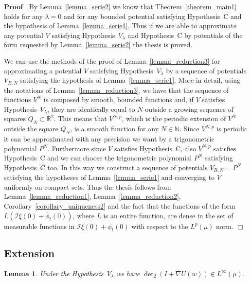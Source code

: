 \documentclass[a4paper,10pt]{article}
\newenvironment{proof}{\noindent\textbf{Proof\ }}{\hspace*{\fill}$\Box$\medskip}
\newtheorem{lemma}{Lemma}
\begin{document}
\begin{proof}
  By Lemma~\ref{lemma_serie2} we know that Theorem~\ref{theorem_main1} holds
  for any $\lambda = 0$ and for any bounded potential satisfying Hypothesis~C
  and the hypothesis of Lemma~\ref{lemma_serie1}. Thus if we are able to
  approximate any potential $V$ satisfying Hypothesis~$V_{\lambda}$ and
  Hypothesis~C by potentials of the form requested by Lemma~\ref{lemma_serie2}
  the thesis is proved.
  
  We can use the methods of the proof of Lemma~\ref{lemma_reduction3} for
  approximating a potential $V$ satisfying Hypothesis~$V_{\lambda}$ by a
  sequence of potentials $V_{B, N}$ satisfying the hypothesis of
  Lemma~\ref{lemma_serie1}. More in detail, using the notations of
  Lemma~\ref{lemma_reduction3}, we have that the sequence of functions $V^N$
  is composed by smooth, bounded functions and, if $V$ satisfies
  Hypothesis~$V_{\lambda}$, they are identically equal to $N$ outside a
  growing sequence of squares $Q_N \subset \mathbb{R}^2$. This means that
  $V^{N, p}$, which is the periodic extension of $V^N$ outside the square
  $Q_N$, is a smooth function for any $N \in \mathbb{N}$. Since $V^{N, p}$ is
  periodic it can be approximated with any precision we want by a
  trigonometric polynomial $P^N$. Furthermore since $V$ satisfies
  Hypothesis~C, also $V^{N, p}$ satisfies Hypothesis~C and we can choose the
  trigonometric polynomial $P^N$ satisfying Hypothesis~C too. In this way we
  construct a sequence of potentials $V_{B, N} = P^N$ satisfying the
  hypotheses of Lemma~\ref{lemma_serie1} and converging to $V$ uniformly on
  compact sets. Thus the thesis follows from Lemma~\ref{lemma_reduction1},
  Lemma~\ref{lemma_reduction2}, Corollary~\ref{corollary_uniqueness2} and the
  fact that the functions of the form $L (\mathcal{I} \xi (0) + \bar{\phi}_t
  (0))$, where $L$ is an entire function, are dense in the set of measurable
  functions in $\mathcal{I} \xi (0) + \bar{\phi}_t (0)$ with respect to the
  $L^p (\mu)$ norm.
\end{proof}

\subsection{Extension}

\begin{lemma}
  \label{theorem_det}Under the Hypothesis~$V_{\lambda}$ we have $\det\nolimits_2 (I +
  \nabla U (w)) \in L^{\infty} (\mu)$.
\end{lemma}
\end{document}
